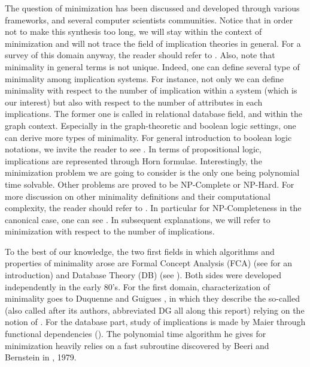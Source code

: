 The question of minimization has been discussed and developed through various 
frameworks, and several computer scientists communities. Notice that in order 
not to make this synthesis too long, we will stay within the context of 
minimization and will not trace the field of implication theories in general. 
For a survey of this domain anyway, the reader should refer to 
\cite{wild_joy_2017}. Also, note that minimality in general terms is not 
unique. Indeed, one can define several type of minimality among implication 
systems. For instance, not only we can define minimality with respect to the 
number of implication within a system (which is our interest) but also with 
respect to the number of attributes in each implications. The former one is 
called  in relational database field, and  within the graph context. Especially in the graph-theoretic and 
boolean logic settings, one can derive more types of minimality. For general 
introduction to boolean logic notations, we invite the reader to see 
\cite{cori_mathematical_2000}. In terms of propositional logic, implications 
are represented through Horn formulae. Interestingly, the minimization problem 
we are going to consider is the only one being polynomial time solvable. Other 
problems are proved to be NP-Complete or NP-Hard. For more discussion on other 
minimality definitions and their computational complexity, the reader should 
refer to \cite{boros_strong_2017, ausiello_directed_2017, 
	b._ganter_conceptual_2016, ausiello_minimal_1986, wild_joy_2017, 
	boros_horn_1998}. In particular for NP-Completeness in the canonical case, 
	one 
can see \cite{hammer_optimal_1993}. In subsequent explanations, we will refer 
to minimization with respect to the number of implications.

\vspace{1.2em}

To the best of our knowledge, the two first fields in which algorithms and 
properties of minimality arose are Formal Concept Analysis (FCA) (see 
\cite{ganter_formal_1999, 
	ganter_two_2010} for an introduction) and Database Theory (DB) (see 
\cite{maier_theory_1983}). Both sides were developed independently in the early 
80's. For the first domain, characterization of minimality goes to Duquenne and 
Guigues \cite{guigues_j.l_familles_1986}, in which they describe the so-called 
 (also called  after its 
authors, abbreviated DG all along this report) relying on the notion of . For the database part, study of implications is made by Maier through functional dependencies (\cite{maier_theory_1983, david_minimum_1980}). The polynomial time algorithm he gives for minimization heavily relies on a fast subroutine discovered by Beeri and Bernstein in \cite{beeri_computational_1979}, 1979.

